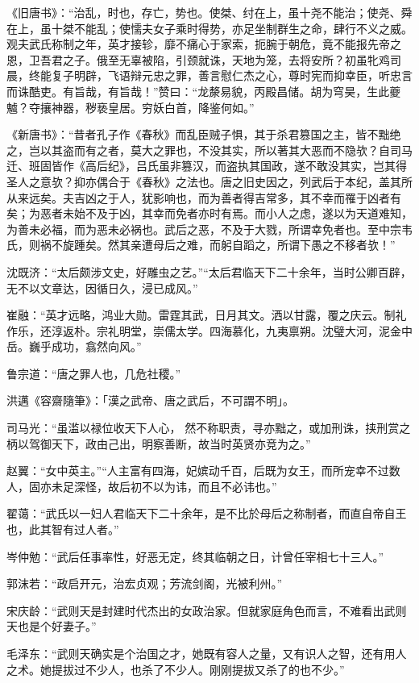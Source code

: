 《旧唐书》：“治乱，时也，存亡，势也。使桀、纣在上，虽十尧不能治；使尧、舜在上，虽十桀不能乱；使懦夫女子乘时得势，亦足坐制群生之命，肆行不义之威。观夫武氏称制之年，英才接轸，靡不痛心于家索，扼腕于朝危，竟不能报先帝之恩，卫吾君之子。俄至无辜被陷，引颈就诛，天地为笼，去将安所？初虽牝鸡司晨，终能复子明辟，飞语辩元忠之罪，善言慰仁杰之心，尊时宪而抑幸臣，听忠言而诛酷吏。有旨哉，有旨哉！”赞曰：“龙漦易貌，丙殿昌储。胡为穹昊，生此夔魖？夺攘神器，秽亵皇居。穷妖白首，降鉴何如。”

《新唐书》：“昔者孔子作《春秋》而乱臣贼子惧，其于杀君篡国之主，皆不黜绝之，岂以其盗而有之者，莫大之罪也，不没其实，所以著其大恶而不隐欤？自司马迁、班固皆作《高后纪》，吕氏虽非篡汉，而盗执其国政，遂不敢没其实，岂其得圣人之意欤？抑亦偶合于《春秋》之法也。唐之旧史因之，列武后于本纪，盖其所从来远矣。夫吉凶之于人，犹影响也，而为善者得吉常多，其不幸而罹于凶者有矣；为恶者未始不及于凶，其幸而免者亦时有焉。而小人之虑，遂以为天道难知，为善未必福，而为恶未必祸也。武后之恶，不及于大戮，所谓幸免者也。至中宗韦氏，则祸不旋踵矣。然其亲遭母后之难，而躬自蹈之，所谓下愚之不移者欤！”

沈既济：“太后颇涉文史，好雕虫之艺。”“太后君临天下二十余年，当时公卿百辟，无不以文章达，因循日久，浸已成风。”

崔融：“英才远略，鸿业大勋。雷霆其武，日月其文。洒以甘露，覆之庆云。制礼作乐，还淳返朴。宗礼明堂，崇儒太学。四海慕化，九夷禀朔。沈璧大河，泥金中岳。巍乎成功，翕然向风。”

鲁宗道：“唐之罪人也，几危社稷。”

洪邁《容齋隨筆》：「漢之武帝、唐之武后，不可謂不明」。

司马光：“虽滥以禄位收天下人心， 然不称职责，寻亦黜之，或加刑诛，挟刑赏之柄以驾御天下，政由己出，明察善断，故当时英贤亦竞为之。”

赵翼：“女中英主。”“人主富有四海，妃嫔动千百，后既为女王，而所宠幸不过数人，固亦未足深怪，故后初不以为讳，而且不必讳也。”

翟蔼：“武氏以一妇人君临天下二十余年，是不比於母后之称制者，而直自帝自王也，此其智有过人者。”

岑仲勉：“武后任事率性，好恶无定，终其临朝之日，计曾任宰相七十三人。”

郭沫若：“政启开元，治宏贞观；芳流剑阁，光被利州。”

宋庆龄：“武则天是封建时代杰出的女政治家。但就家庭角色而言，不难看出武则天也是个好妻子。”

毛泽东：“武则天确实是个治国之才，她既有容人之量，又有识人之智，还有用人之术。她提拔过不少人，也杀了不少人。刚刚提拔又杀了的也不少。”

